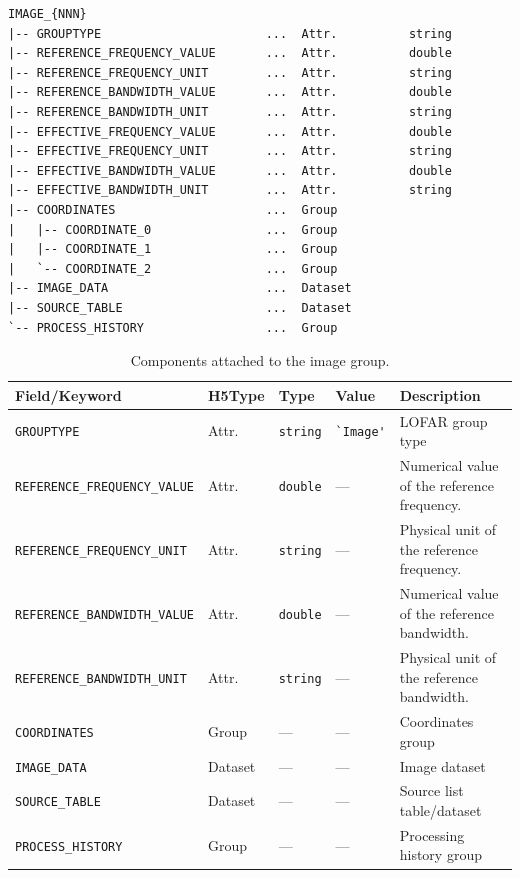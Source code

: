 \documentclass[a4paper,10pt,bibtotoc]{scrartcl}
\begin{document}
\begin{lstlisting}
IMAGE_{NNN}
|-- GROUPTYPE                       ...  Attr.          string
|-- REFERENCE_FREQUENCY_VALUE       ...  Attr.          double
|-- REFERENCE_FREQUENCY_UNIT        ...  Attr.          string
|-- REFERENCE_BANDWIDTH_VALUE       ...  Attr.          double
|-- REFERENCE_BANDWIDTH_UNIT        ...  Attr.          string
|-- EFFECTIVE_FREQUENCY_VALUE       ...  Attr.          double
|-- EFFECTIVE_FREQUENCY_UNIT        ...  Attr.          string
|-- EFFECTIVE_BANDWIDTH_VALUE       ...  Attr.          double
|-- EFFECTIVE_BANDWIDTH_UNIT        ...  Attr.          string
|-- COORDINATES                     ...  Group
|   |-- COORDINATE_0                ...  Group
|   |-- COORDINATE_1                ...  Group
|   `-- COORDINATE_2                ...  Group
|-- IMAGE_DATA                      ...  Dataset
|-- SOURCE_TABLE                    ...  Dataset
`-- PROCESS_HISTORY                 ...  Group
\end{lstlisting}

\begin{table}[htbp]
  \centering
  \begin{tabular}{|llllp{6cm}|}
    \hline
    \sc Field/Keyword & \sc H5Type & \sc Type & Value &\sc Description \\
    \hline \hline
    \small\verb|GROUPTYPE| & Attr.
                           & \verb|string|
                           & \verb|`Image'|
                           & LOFAR group type \\
    \small\verb|REFERENCE_FREQUENCY_VALUE| & Attr.
                           & \verb|double|
                           & ---
                           & Numerical value of the reference frequency. \\
    \small\verb|REFERENCE_FREQUENCY_UNIT| & Attr.
                           & \verb|string|
                           & ---
                           & Physical unit of the reference frequency. \\
    \small\verb|REFERENCE_BANDWIDTH_VALUE| & Attr.
                           & \verb|double|
                           & ---
                           & Numerical value of the reference bandwidth. \\
    \small\verb|REFERENCE_BANDWIDTH_UNIT| & Attr.
                           & \verb|string|
                           & ---
                           & Physical unit of the reference bandwidth. \\
    \hline
    \small\verb|COORDINATES|     & Group   & --- & --- & Coordinates group         \\
    \small\verb|IMAGE_DATA|      & Dataset & --- & --- & Image dataset             \\
    \small\verb|SOURCE_TABLE|    & Dataset & --- & --- & Source list table/dataset \\
    \small\verb|PROCESS_HISTORY| & Group   & --- & --- & Processing history group  \\
    \hline
  \end{tabular}
  \caption{Components attached to the image group.}
  \label{tab:Image group Attributes}
\end{table}
\end{document}
